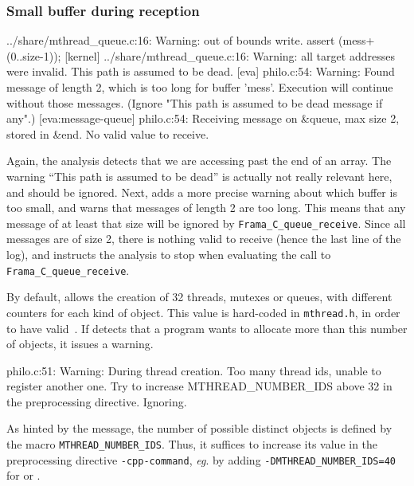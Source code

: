\documentclass{frama-c-book}
\def\eg.{\emph{eg}.}
\begin{document}
\begin{description}
\subsubsection{Small buffer during reception}
\nopagebreak[4]
\begin{logs}
[kernel] ../share/mthread_queue.c:16: Warning: out of bounds write.
          assert \valid(mess+(0..size-1));
[kernel] ../share/mthread_queue.c:16: Warning: all target addresses were
        invalid. This path is assumed to be dead.
[eva] philo.c:54: Warning: Found message of length 2, which is too long for
        buffer 'mess'. Execution will continue without those messages.
       (Ignore "This path is assumed to be dead message if any".)
[eva:message-queue] philo.c:54: Receiving message on &queue, max size 2, stored in &end.
        No valid value to receive.
\end{logs}
Again, the \Eva analysis detects that we are accessing past the end
of an array.  The warning ``This path is assumed to be dead'' is
actually not really relevant here, and should be ignored. Next,
\mthread adds a more precise warning about which buffer is too small,
and warns that messages of length 2 are too long. This means that any
message of at least that size will be ignored by
\verb+Frama_C_queue_receive+.  Since all messages are of size 2,
there is nothing valid to receive (hence the last line of the log),
and \mthread instructs the \Eva analysis to stop when evaluating the
call to \verb+Frama_C_queue_receive+.


\item[Too many objects.]
  By default, \mthread allows the creation of 32 threads, mutexes or queues,
  with different counters for each kind of object. This value
  is hard-coded in \verb+mthread.h+, in order to have valid~\C.
  If \mthread detects that a program wants to allocate more than this
  number of objects, it issues a warning.
  \begin{logs}
[eva] philo.c:51: Warning: During thread creation. Too many thread ids,
         unable to register another one. Try to increase MTHREAD_NUMBER_IDS
         above 32 in the preprocessing directive. Ignoring.
  \end{logs}
  As hinted by the message, the number of possible distinct \mthread
  objects is defined by the \C
  macro \verb+MTHREAD_NUMBER_IDS+. Thus, it suffices to increase its
  value in the preprocessing directive \verb+-cpp-command+, \eg. by
  adding \verb+-DMTHREAD_NUMBER_IDS=40+ for \gcc or .



\end{description}
\end{document}
